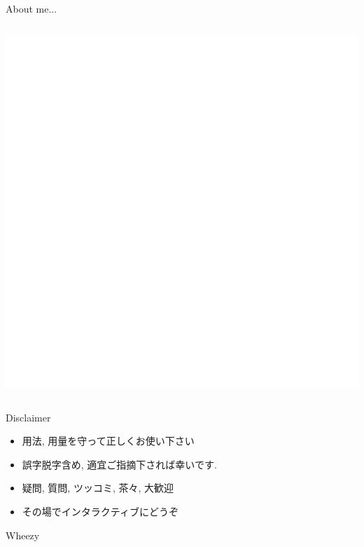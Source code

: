 \documentclass[cjk,dvipdfmx,12pt,compress,%
hyperref={bookmarks=true,bookmarksnumbered=true,bookmarksopen=false,%
  colorlinks=false,%
  pdftitle={第 66 回 関西 Debian 勉強会@KOF2012},%
  pdfauthor={佐々木洋平},%
  pdfsubject={資料},%
}]{beamer}
\begin{document}
\begin{frame}{About me...}
\begin{columns}
\begin{column}{.29\textwidth}
      \includegraphics[width=.9\textwidth]{./image201211/OSC_GPG.png}
    \end{column}
  \end{columns}
\end{frame}

\begin{frame}{Disclaimer}
  \begin{itemize}
  \item 用法, 用量を守って正しくお使い下さい
  \item 誤字脱字含め, 適宜ご指摘下されば幸いです.
  \item 疑問, 質問, ツッコミ, 茶々, \alert{大歓迎}
  \item その場でインタラクティブにどうぞ
\end{itemize}
\end{frame}

\settitleslide
{}
\begin{frame}\end{frame}
%
\begin{frame}
  \begin{center}
    {\fontsize{80pt}{80pt}\alert{Wheezy}}
  \end{center}
\end{frame}
\setdefaultslide
\end{document}
